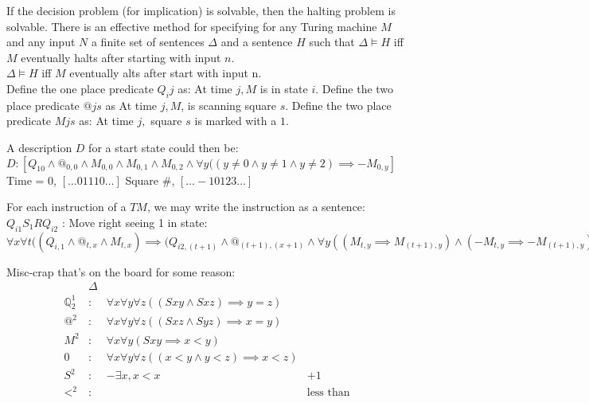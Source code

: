 \begin{lemma}[Undecibality]
If the decision problem (for implication) is solvable, then the halting problem is solvable.
There is an effective method for specifying for any Turing machine $M$ and any input $N$ a finite set of sentences $\Delta$ and a sentence $H$ such that $\Delta \vDash H$ iff $M$ eventually halts after starting with input $n$. \\
$\Delta \vDash H$ iff $M$ eventually alts after start with input n.\\


Define the one place predicate $Q_ij$ as: At time $j, M$ is in state $i$.
Define the two place predicate $@js$ as At time $j, M$, is scanning square $s$.
Define the two place predicate $Mjs$ as: At time $j,$ square $s$ is marked with a $1$.

A description $D$ for a start state could then be:
$D: [Q_10 \wedge @_{0,0} \wedge M_{0,0} \wedge M_{0,1} \wedge M_{0,2} \wedge \forall y((y \not = 0 \wedge y \not = 1 \wedge y \not = 2 ) \implies - M_{0,y}]$
Time = 0, $[ \dots 0 1 1 1 0 \dots ]$
Square \#, $[\dots -1 0 1 2 3 \dots ]$

\end{lemma}

For each instruction of a $TM$, we may write the instruction as a sentence: \\
$Q_{i1}S_1RQ_{i2}$ : 
Move right seeing 1 in state: \\
$\forall x \forall t ((Q_{i,1} \wedge @_{t,x} \wedge M_{t,x}) \implies (Q_{i2,(t+1)} \wedge @_{(t+1),(x+1)} \wedge \forall y((M_{t,y} \implies M_{(t+1),y}) \wedge (- M_{t,y} \implies - M_{(t+1),y}))$


Misc-crap that's on the board for some reason: \\
\begin{align*}
 & \Delta \\
\mathbb{Q}^1_2  &:& \forall x \forall y \forall z ((Sxy \wedge Sxz) \implies y = z)       & \text{}\\
@^2            &:& \forall x \forall y \forall z ((Sxz \wedge Syz) \implies x = y )       & \text{}\\
M^2             &:& \forall x \forall y ( Sxy \implies x < y )                            & \text{}\\
0               &:& \forall x \forall y \forall z ((x < y \wedge y < z ) \implies x < z ) & \text{}\\
S^2             &:& - \exists x , x < x                                                   & \text{+1}\\
<^2             &:& & \text{less than}
\end{align*}

